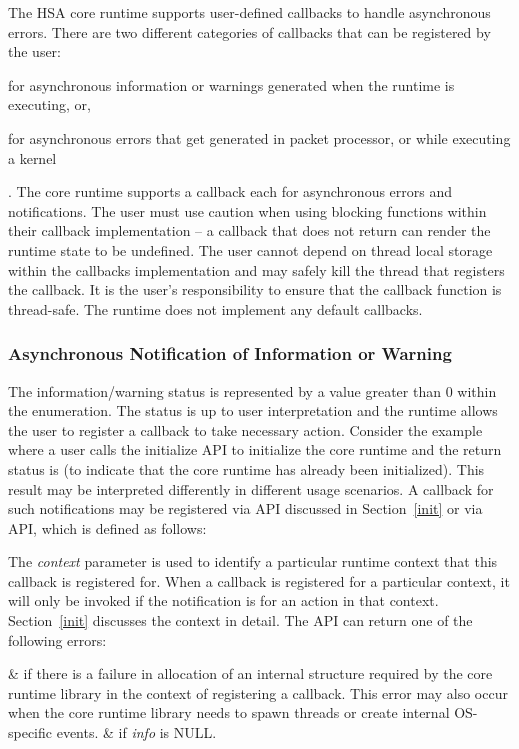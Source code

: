 The HSA core runtime supports user-defined callbacks to handle
asynchronous errors. There are two different categories of callbacks
that can be registered by the user: \begin{inparaenum}[(i)] \item
for asynchronous information or warnings generated when the runtime
is executing, or, \item for asynchronous errors that get generated
in packet processor, or while executing a kernel \end{inparaenum}.
The core runtime supports a callback each for asynchronous errors
and notifications.
The user must use caution when using blocking functions within their
callback implementation -- a callback that does not return can
render the runtime state to be undefined. The user cannot depend on
thread local storage within the callbacks implementation and may
safely kill the thread that registers the callback. It is the user's
responsibility to ensure that the callback function is thread-safe.
The runtime does not implement any default callbacks.

\subsubsection{Asynchronous Notification of Information or
Warning}\label{asynnotif}

The information/warning status is represented by a value greater
than 0 within the  enumeration. The status is
up to user interpretation and the runtime allows the user to
register a callback to take necessary action. Consider the example
where a user calls the initialize API to initialize the core runtime
and the return status is
 (to indicate that
the core runtime has already been initialized). This result may be
interpreted differently in different usage scenarios. A callback for
such notifications may be registered via  API
discussed in Section~\ref{init} or via
 API, which is defined
as follows:



The {\itshape context} parameter is used to identify a particular
runtime context that this callback is registered for. When a
callback is registered for a particular context, it will only be
invoked if the notification is for an action in that context.
Section~\ref{init} discusses the context in detail. The
 API can return one of
the following errors:
\begin{easylist}
&  if there is a failure
in allocation of an internal structure required by the core runtime
library in the context of registering a callback. This error may
also occur when the core runtime library needs to spawn threads or
create internal OS-specific events. 
&  
if {\itshape info} is NULL.
\end{easylist}

